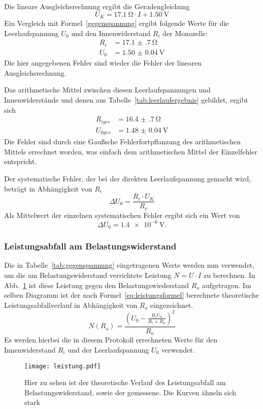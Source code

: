 Die lineare Ausgleichsrechnung ergibt die Geradengleichung
\begin{equation}
U_{K} = \SI{17.1}{\ohm}\cdot I + \SI{1.50}{\volt}
\end{equation}
Ein Vergleich mit Formel~\eqref{gegenspannung} ergibt folgende 
Werte für die Leerlaufspannung $U_{0}$ und den 
Innenwiderstand $R_{i}$ der Monozelle:
\begin{align*}
R_{i}&=\SI{17.1(7)}{\ohm}\\
U_{0}&=\SI{1.50(4)}{\volt}
\end{align*}
Die hier angegebenen Fehler sind wieder die Fehler der linearen 
Ausgleichsrechnung.

Das arithmetische Mittel zwischen diesen 
Leerlaufspannungen und Innenwiderstände 
und denen aus Tabelle~\ref{tab:leerlaufergebnis} gebildet, 
ergibt sich 
\begin{align*}
R_{iges}&=\SI{16.4(7)}{\ohm}\\
U_{0ges}&=\SI{1.48(4)}{\volt}
\end{align*}
Die Fehler sind durch eine Gaußsche Fehlerfortpflanzung des arithmetischen 
Mittels errechnet worden, was einfach dem arithmetischen Mittel der 
Einzelfehler entspricht.


Der systematische Fehler, der bei der direkten Leerlaufspannung 
gemacht wird, beträgt in Abhängigkeit von $R_{i}$
\begin{equation*}
\Delta U_{0} = \frac{R_{i}\cdot U_{K}}{R_{v}}
\end{equation*}
Als Mittelwert der einzelnen systematischen Fehler ergibt sich ein 
Wert von 
\begin{equation*}
\Delta \overline{U_{0}} = \SI{1.4e-6}{\volt}.
\end{equation*}
%
\subsubsection{Leistungsabfall am Belastungswiderstand}
Die in Tabelle~\ref{tab:gegenspannung} eingetragenen Werte werden nun 
verwendet, um die am Belastungswiderstand verrichtete Leistung 
$N = U\cdot I$ zu berechnen. In Abb.~\ref{fig:leistung} ist diese Leistung 
gegen den Belastungswiederstand $R_{a}$ aufgetragen. 
Im selben Diagramm ist der nach Formel~\eqref{eq:leistungsformel} 
berechnete theoretische Leistungsabfallverlauf in Abhängigkeit von 
$R_\text{a}$ eingezeichnet.
\begin{equation}
\label{eq:leistungsformel}
N(R_\text{a})=\frac{(U_{0}-\frac{R_{i}U_{0}}{R_{i}+R_{a}})^2}{R_{a}}
\end{equation}
Es werden hierbei die in diesem Protokoll errechneten Werte für den 
Innenwiderstand $R_{i}$ und der Leerlaufspannung $U_{0}$ 
verwendet.

\begin{figure}[]
\centering
\texttt{[image: leistung.pdf]}
\caption{Hier zu sehen ist der theoretische Verlauf des Leistungsabfall 
am Belastungswiderstand, sowie der gemessene. Die Kurven ähneln sich 
stark}
\label{fig:leistung}
\end{figure}